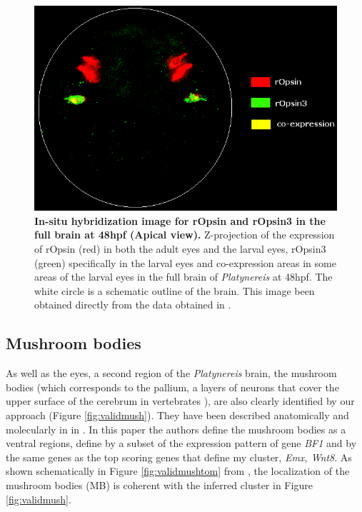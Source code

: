 	
	\begin{figure}[H]
\centerline{\includegraphics[width=1\linewidth]{gfx/chapter6/insitu.png}}
\caption{{\bf In-situ hybridization image for rOpsin and rOpsin3 in the full brain at 48hpf (Apical view).} Z-projection of the expression of rOpsin (red) in both the adult eyes and the larval eyes, rOpsin3 (green) specifically in the larval eyes and co-expression areas in some areas of the larval eyes in the full brain of {\it{Platynereis}} at 48hpf. The white circle is a schematic outline of the brain.  This image been obtained directly from the data obtained in \citep{Tomer10}.}
\label{fig:valideyesinsitu}
	\end{figure}
	
	
		\subsection{Mushroom bodies}
		As well as the eyes, a second region of the {\it{Platynereis}} brain, the mushroom bodies (which corresponds to the pallium, a layers of neurons that cover the upper surface of the cerebrum in vertebrates \citep{Tomer10}), are also clearly identified by our approach (Figure \ref{fig:validmush}). They have been described anatomically and molecularly in \platy{} in \citep{Tomer10}. In this paper the authors define the mushroom bodies as a ventral regions, define by a subset of the expression pattern of gene \emph{BF1} and by the same genes as the top scoring genes that define my cluster, \emph{Emx, Wnt8}. As shown schematically in Figure \ref{fig:validmushtom} from \citep{Tomer10}, the localization of the mushroom bodies (MB) is coherent with the inferred cluster in Figure \ref{fig:validmush}.
		
